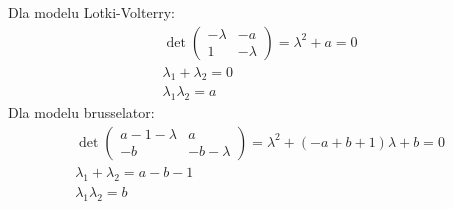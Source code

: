 \documentclass[10pt, a4paper, twoside, onecolumn]{article}
\numberwithin{equation}{section}
\begin{document}
	Dla modelu Lotki-Volterry:
	\begin{equation}\label{lotka_volterra_charakterystyczne}
	\begin{split}
		\det
		\begin{pmatrix}
			-\lambda & -a \\
			1 & -\lambda
		\end{pmatrix}
		=\lambda^{2}+a=0 \\
		\lambda_{1}+\lambda_{2}=0 \\
		\lambda_{1}\lambda_{2}=a
	\end{split}
	\end{equation}
	Dla modelu brusselator:
	\begin{equation}\label{bruskelator_charakterystyczne}
	\begin{split}
		\det
		\begin{pmatrix}
			a-1-\lambda & a \\
			-b & -b-\lambda
		\end{pmatrix}
		=\lambda^{2}+(-a+b+1)\lambda+b=0 \\
		\lambda_{1}+\lambda_{2}=a-b-1 \\
		\lambda_{1}\lambda_{2}=b
	\end{split}
	\end{equation}
	
\end{document}
